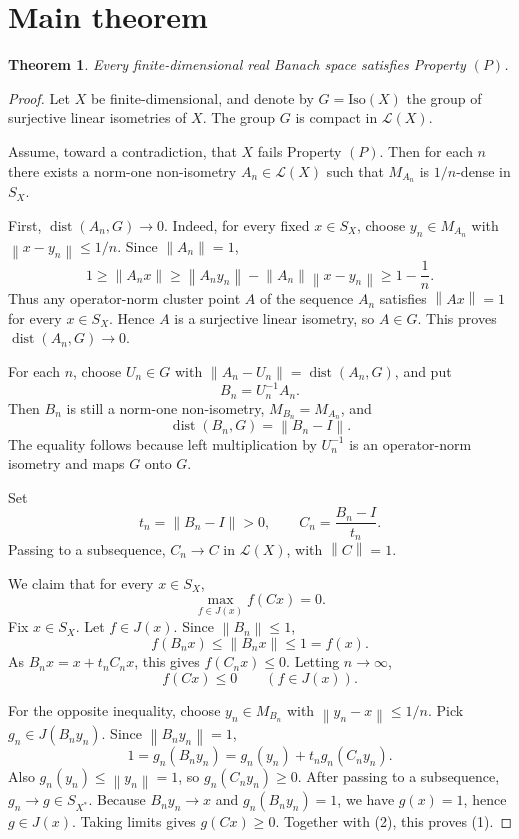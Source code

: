 \documentclass[11pt]{article}
\newtheorem{theorem}{Theorem}
\newcommand{\SX}{S_X}
\newcommand{\Iso}{\mathrm{Iso}(X)}
\newcommand{\dist}{\operatorname{dist}}
\newcommand{\Lin}{\mathcal{L}(X)}
\newcommand{\norm}[1]{\left\lVert #1 \right\rVert}
\begin{document}
\section*{Main theorem}

\begin{theorem}
Every finite-dimensional real Banach space satisfies Property \((P)\).
\end{theorem}

\begin{proof}
Let \(X\) be finite-dimensional, and denote by \(G=\Iso\) the group of
surjective linear isometries of \(X\).  The group \(G\) is compact in \(\Lin\).

Assume, toward a contradiction, that \(X\) fails Property \((P)\).  Then for
each \(n\) there exists a norm-one non-isometry \(A_n\in \Lin\) such that
\(M_{A_n}\) is \(1/n\)-dense in \(\SX\).

First, \(\dist(A_n,G)\to0\).  Indeed, for every fixed \(x\in \SX\), choose
\(y_n\in M_{A_n}\) with \(\norm{x-y_n}\le1/n\).  Since \(\norm{A_n}=1\),
\[
  1\ge \norm{A_nx}
    \ge \norm{A_ny_n}-\norm{A_n}\norm{x-y_n}
    \ge 1-\frac1n .
\]
Thus any operator-norm cluster point \(A\) of the sequence \(A_n\) satisfies
\(\norm{Ax}=1\) for every \(x\in \SX\).  Hence \(A\) is a surjective linear
isometry, so \(A\in G\).  This proves \(\dist(A_n,G)\to0\).

For each \(n\), choose \(U_n\in G\) with
\(\norm{A_n-U_n}=\dist(A_n,G)\), and put
\[
  B_n=U_n^{-1}A_n .
\]
Then \(B_n\) is still a norm-one non-isometry, \(M_{B_n}=M_{A_n}\), and
\[
  \dist(B_n,G)=\norm{B_n-I}.
\]
The equality follows because left multiplication by \(U_n^{-1}\) is an
operator-norm isometry and maps \(G\) onto \(G\).

Set
\[
  t_n=\norm{B_n-I}>0,\qquad C_n=\frac{B_n-I}{t_n}.
\]
Passing to a subsequence, \(C_n\to C\) in \(\Lin\), with \(\norm{C}=1\).

We claim that for every \(x\in \SX\),
\[
  \max_{f\in J(x)} f(Cx)=0. \tag{1}
\]
Fix \(x\in\SX\).  Let \(f\in J(x)\).  Since \(\norm{B_n}\le1\),
\[
  f(B_nx)\le \norm{B_nx}\le1=f(x).
\]
As \(B_nx=x+t_nC_nx\), this gives \(f(C_nx)\le0\).  Letting \(n\to\infty\),
\[
  f(Cx)\le0\qquad(f\in J(x)). \tag{2}
\]

For the opposite inequality, choose \(y_n\in M_{B_n}\) with
\(\norm{y_n-x}\le1/n\).  Pick \(g_n\in J(B_ny_n)\).  Since
\(\norm{B_ny_n}=1\),
\[
  1=g_n(B_ny_n)=g_n(y_n)+t_n g_n(C_ny_n).
\]
Also \(g_n(y_n)\le\norm{y_n}=1\), so \(g_n(C_ny_n)\ge0\).  After passing to a
subsequence, \(g_n\to g\in S_{X^*}\).  Because \(B_ny_n\to x\) and
\(g_n(B_ny_n)=1\), we have \(g(x)=1\), hence \(g\in J(x)\).  Taking limits
gives \(g(Cx)\ge0\).  Together with (2), this proves (1).


\end{proof}
\end{document}
